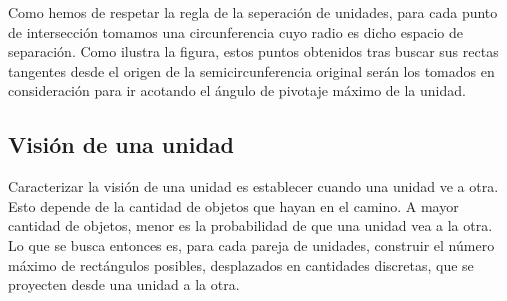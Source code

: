 \documentclass[a4paper,11pt]{article} %
\begin{document}
\begin{minipage}[h]{0.5\columnwidth}
\end{minipage}
\begin{minipage}[h]{0.34\columnwidth}
Como hemos de respetar la regla de la seperación de unidades, para
cada punto de intersección tomamos una circunferencia cuyo radio es dicho
espacio de separación. Como ilustra la figura, estos puntos obtenidos
tras buscar sus rectas tangentes desde el origen de la
semicircunferencia original serán los
tomados en consideración para ir acotando el ángulo de pivotaje máximo
de la unidad.
\end{minipage}

\subsection{Visión de una unidad}
\noindent
Caracterizar la visión de una unidad es establecer cuando una unidad
ve a otra. Esto depende de la cantidad de objetos que hayan en el
camino. A mayor cantidad de objetos, menor es la probabilidad de que
una unidad vea a la otra.\\

\noindent
Lo que se busca entonces es, para cada pareja de unidades, construir
el número máximo de rectángulos posibles, desplazados en cantidades
discretas, que se proyecten desde una unidad a la otra.
\end{document}
